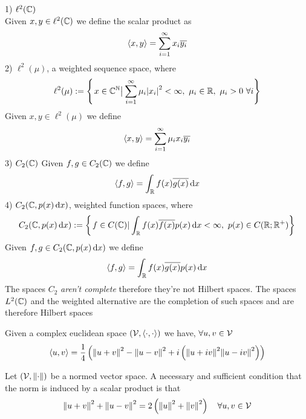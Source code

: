 \documentclass[../complete.tex]{subfiles}
\begin{document}
\begin{eg}
	1) $\ell^2(\mathbb{C})$\\
	Given $x,y\in\ell^2(\mathbb{C})$ we define the scalar product as
	\begin{equation*}
		\langle x, y \rangle=\sum_{i=1}^\infty x_i\overline{y_i}
	\end{equation*}
	2) $\ell^2(\mu)$, a weighted sequence space, where
	\begin{equation*}
		\ell^2(\mu):=\left\{ \derin{x\in\Cf^{\N}}\sum_{i=1}^\infty\mu_i\abs{x_i}^2<\infty,\ \mu_i\in\R,\ \mu_i>0\ \forall i \right\}
	\end{equation*}
	Given $x,y\in\ell^2(\mu)$ we define
	\begin{equation*}
		\langle x, y \rangle=\sum_{i=1}^\infty\mu_ix_i\overline{y_i}
	\end{equation*}
	3) $C_2(\mathbb{C})$
	Given $f,g\in C_2(\mathbb{C})$ we define
	\begin{equation*}
		\langle f, g \rangle=\int_{\mathbb{R}} f(x)\overline{g(x)}\operatorname{d\!} x
	\end{equation*}
	4) $C_2(\mathbb{C},p(x)\operatorname{d\!} x)$, weighted function spaces, where
	\begin{equation*}
		C_2(\mathbb{C},p(x)\operatorname{d\!} x):=\left\{ \left.f\in C(\mathbb{C})\right|_{}\int_{\mathbb{R}} f(x)\overline{f(x)}p(x)\operatorname{d\!} x<\infty,\ p(x)\in C(\mathbb{R};\mathbb{R}^+) \right\}
	\end{equation*}
	Given $f,g\in C_2(\mathbb{C},p(x)\operatorname{d\!} x)$ we define
	\begin{equation*}
		\langle f, g \rangle=\int_{\mathbb{R}} f(x)\overline{g(x)}p(x)\operatorname{d\!} x
	\end{equation*}
	The spaces $C_2$ \emph{aren't complete} therefore they're not Hilbert spaces. The spaces $L^2(\mathbb{C})$ and the weighted alternative are the completion of such spaces and are therefore Hilbert spaces
\end{eg}
\begin{thm}
	Given a complex euclidean space $(\mathcal{V},\langle \cdot, \cdot \rangle)$ we have, $\forall u,v\in\mathcal{V}$
	\begin{equation}
		\langle u, v \rangle=\frac{1}{4}\left( \norm{u+v}^2-\norm{u-v}^2+i\left( \norm{u+iv}^2\norm{u-iv}^2 \right) \right)
		\label{eq:polarizationid}
	\end{equation}
\end{thm}
\begin{thm}
	Let $(\mathcal{V},\norm{\cdot})$ be a normed vector space. A necessary and sufficient condition that the norm is induced by a scalar product is that
	\begin{equation}
		\norm{u+v}^2+\norm{u-v}^2=2\left( \norm{u}^2+\norm{v}^2 \right)\quad\forall u,v\in\mathcal{V}
		\label{eq:parallelogramrule}
	\end{equation}
\end{thm}
\end{document}
